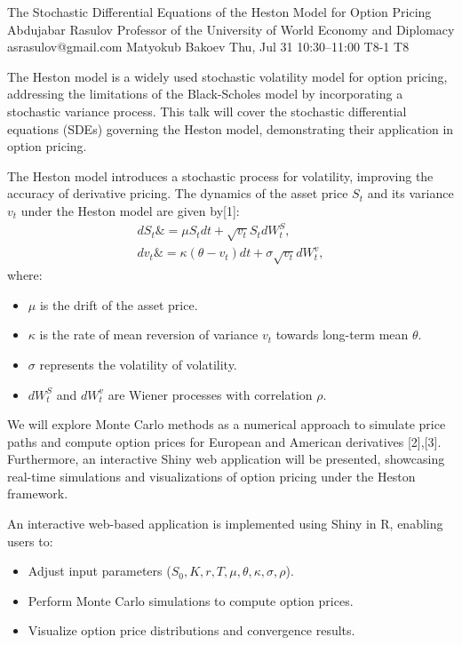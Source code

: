 \begin{talk}
  {The Stochastic Differential Equations of the Heston Model for Option Pricing}%
  {Abdujabar Rasulov}%
  {Professor of the University of World Economy and Diplomacy}%
  {asrasulov@gmail.com}%
  {Matyokub Bakoev}%
  {}%
  {Thu, Jul 31 10:30–11:00}%
  {T8-1}%
  {T8}%
  
							
The Heston model is a widely used stochastic volatility model for option pricing, addressing the limitations of the Black-Scholes model by incorporating a stochastic variance process. This talk will cover the stochastic differential equations (SDEs) governing the Heston model, demonstrating their application in option pricing. 

The Heston model introduces a stochastic process for volatility, improving the accuracy of derivative pricing. 
The dynamics of the asset price $S_t$ and its variance $v_t$ under the Heston model are given by[1]:
\begin{align}
    dS_t \&= \mu S_t dt + \sqrt{v_t} S_t dW_t^S, \\
    dv_t \&= \kappa(\theta - v_t) dt + \sigma \sqrt{v_t} dW_t^v,
\end{align}
where:
\begin{itemize}
    \item $\mu$ is the drift of the asset price.
    \item $\kappa$ is the rate of mean reversion of variance $v_t$ towards long-term mean $\theta$.
    \item $\sigma$ represents the volatility of volatility.
    \item $dW_t^S$ and $dW_t^v$ are Wiener processes with correlation $\rho$.
\end{itemize}

We will explore Monte Carlo methods as a numerical approach to simulate price paths and compute option prices for European and American derivatives [2],[3]. Furthermore, an interactive Shiny web application will be presented, showcasing real-time simulations and visualizations of option pricing under the Heston framework.

An interactive web-based application is implemented using Shiny in R, enabling users to:
\begin{itemize}
    \item Adjust input parameters ($S_0, K, r, T, \mu, \theta, \kappa, \sigma, \rho$).
    \item Perform Monte Carlo simulations to compute option prices.
    \item Visualize option price distributions and convergence results.
\end{itemize}


\end{talk}
